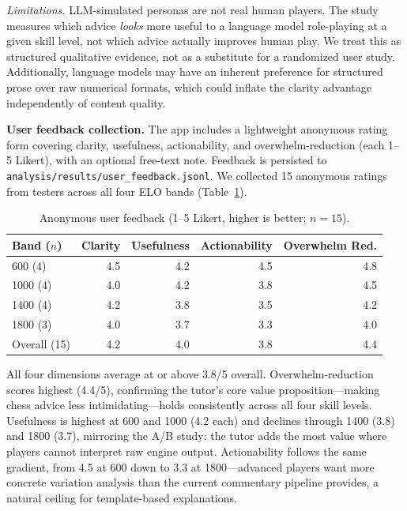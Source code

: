 \documentclass[11pt]{article}
\begin{document}
\emph{Limitations.} LLM-simulated personas are not real human players. The study measures which advice \emph{looks} more useful to a language model role-playing at a given skill level, not which advice actually improves human play. We treat this as structured qualitative evidence, not as a substitute for a randomized user study. Additionally, language models may have an inherent preference for structured prose over raw numerical formats, which could inflate the clarity advantage independently of content quality.

\textbf{User feedback collection.} The app includes a lightweight anonymous rating form covering clarity, usefulness, actionability, and overwhelm-reduction (each 1--5 Likert), with an optional free-text note. Feedback is persisted to \texttt{analysis/results/user\_feedback.jsonl}. We collected 15 anonymous ratings from testers across all four ELO bands (Table~\ref{tab:user-feedback}).

\begin{table}[h]
\centering
\caption{Anonymous user feedback (1--5 Likert, higher is better; $n=15$).}
\label{tab:user-feedback}
\begin{tabular}{@{}lrrrr@{}}
\toprule
Band ($n$) & Clarity & Usefulness & Actionability & Overwhelm Red. \\
\midrule
600 (4)  & 4.5 & 4.2 & 4.5 & 4.8 \\
1000 (4) & 4.0 & 4.2 & 3.8 & 4.5 \\
1400 (4) & 4.2 & 3.8 & 3.5 & 4.2 \\
1800 (3) & 4.0 & 3.7 & 3.3 & 4.0 \\
\addlinespace
Overall (15) & 4.2 & 4.0 & 3.8 & 4.4 \\
\bottomrule
\end{tabular}
\end{table}

All four dimensions average at or above 3.8/5 overall. Overwhelm-reduction scores highest (4.4/5), confirming the tutor's core value proposition---making chess advice less intimidating---holds consistently across all four skill levels. Usefulness is highest at 600 and 1000 (4.2 each) and declines through 1400 (3.8) and 1800 (3.7), mirroring the A/B study: the tutor adds the most value where players cannot interpret raw engine output. Actionability follows the same gradient, from 4.5 at 600 down to 3.3 at 1800---advanced players want more concrete variation analysis than the current commentary pipeline provides, a natural ceiling for template-based explanations.
\end{document}
